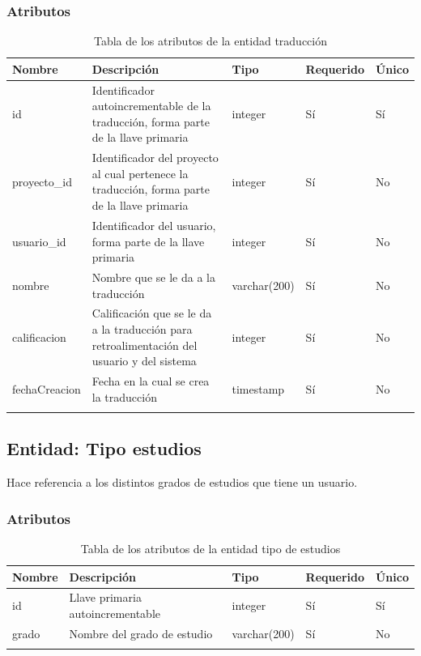 \subsubsection{Atributos}
\begin{center}
	\begin{longtable}{|J{3cm}|J{4cm}|J{3cm}|J{2cm}|J{2cm}|}
		\hline
		\textbf{Nombre} & \textbf{Descripción} & \textbf{Tipo} & \textbf{Requerido} & \textbf{Único} \\ \hline
		id & Identificador autoincrementable de la traducción, forma parte de la llave primaria & integer & Sí & Sí \\ \hline
		proyecto\_id & Identificador del proyecto al cual pertenece la traducción, forma parte de la llave primaria & integer & Sí & No \\ \hline
		usuario\_id & Identificador del usuario, forma parte de la llave primaria & integer & Sí & No \\ \hline
		nombre & Nombre que se le da a la traducción & varchar(200) & Sí & No \\ \hline
		calificacion & Calificación que se le da a la traducción para retroalimentación del usuario y del sistema & integer & Sí & No\\ \hline
		fechaCreacion & Fecha en la cual se crea la traducción & timestamp & Sí & No \\ \hline
		\caption{Tabla de los atributos de la entidad traducción}
		\label{tbl:entidad-traduccion}
	\end{longtable}
\end{center}
\subsection{Entidad: Tipo estudios}
Hace referencia a los distintos grados de estudios que tiene un usuario.
\subsubsection{Atributos}
\begin{center}
	\begin{longtable}{|J{3cm}|J{4cm}|J{3cm}|J{2cm}|J{2cm}|}
		\hline
		\textbf{Nombre} & \textbf{Descripción} & \textbf{Tipo} & \textbf{Requerido} & \textbf{Único} \\ \hline
		id & Llave primaria autoincrementable & integer & Sí & Sí \\ \hline
		grado & Nombre del grado de estudio & varchar(200) & Sí & No \\ \hline
		\caption{Tabla de los atributos de la entidad tipo de estudios}
		\label{tbl:entidad-tipo-estudios}
	\end{longtable}
\end{center}
